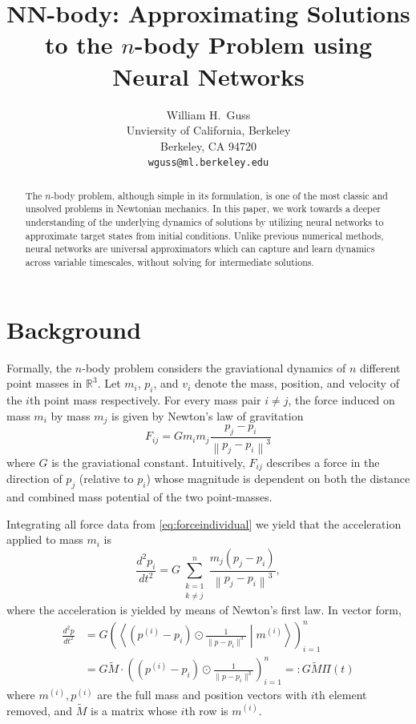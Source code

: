 \documentclass{article}
\title{NN-body: Approximating Solutions to the $n$-body Problem using Neural Networks}
\author{
  William H.~Guss \\
  Unviersity of California, Berkeley\\
  Berkeley, CA 94720 \\
  \texttt{wguss@ml.berkeley.edu} 
}
\numberwithin{theorem}{section}
\numberwithin{equation}{section}
\begin{document}

\maketitle

\begin{abstract} 
The $n$-body problem, although simple in its formulation, is one of the most classic and unsolved problems in Newtonian mechanics. In this paper, we work towards a deeper understanding of the underlying dynamics of solutions by utilizing neural networks to approximate target states from initial conditions. Unlike previous numerical methods, neural networks are universal approximators which can capture and learn dynamics across variable timescales, without solving for intermediate solutions. 
\end{abstract} 


\section{Background} Formally, the $n$-body problem considers the graviational dynamics of $n$ different point masses in $\mathbb{R}^3$. Let $m_i$, $p_i$, and $v_i$ denote the mass, position, and velocity of the $i$th point mass respectively. For every mass pair $i \neq j$, the force induced on mass $m_i$ by mass $m_j$ is given by Newton's law of gravitation
\begin{equation}\label{eq:forceindividual}
	F_{ij} = G m_i m_j \frac{p_j - p_i}{\left\|p_j - p_i\right\|^3}
\end{equation}
where $G$ is the graviational constant. Intuitively, $F_{ij}$ describes a force in the direction of $p_j$ (relative to $p_i$) whose magnitude is dependent on both the distance and combined mass potential of the two point-masses.

Integrating all force data from \eqref{eq:forceindividual} we yield that the acceleration applied to mass $m_i$ is
\begin{equation}
	\frac{d^2p_i}{dt^2}= G \sum_{\substack{k=1 \\ k\neq j}}^n  \frac{ m_j(p_j - p_i)}{\left\|p_j - p_i\right\|^3},
\end{equation}
where the acceleration is yielded by means of Newton's first law. In vector form,
\begin{equation}\label{eq:nbodyvec}
\begin{aligned}
	\frac{d^2p}{dt^2} &= G \left({\left\langle \left(p^{(i)} - p_i\right)\odot \frac{1}{\|p - p_i\|^3} \mathrel{}\middle|\mathrel{} m^{(i)} \right\rangle}\right)_{i=1}^n \\
	&= G  \tilde{M} \cdot \left(\left(p^{(i)} - p_i\right)\odot \frac{1}{\|p - p_i\|^3} \right)_{i=1}^n =: G \tilde{M}  \Pi(t)
\end{aligned}
\end{equation}
where $m^{(i)}, p^{(i)}$ are the full mass and position vectors with $i$th element removed, and $\tilde{M}$ is a matrix whose $i$th row is $m^{(i)}$.
\end{document}
